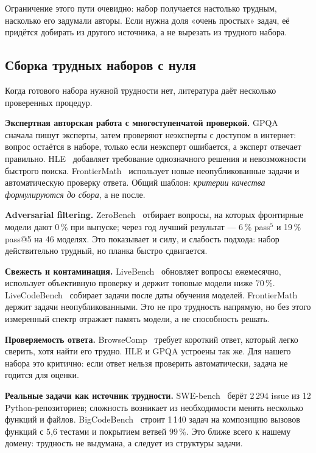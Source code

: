 \documentclass[11pt,a4paper]{article}
\begin{document}
Ограничение этого пути очевидно: набор получается настолько трудным,
насколько его задумали авторы. Если нужна доля «очень простых» задач, её
придётся добирать из другого источника, а не вырезать из трудного набора.

\subsection{Сборка трудных наборов с нуля}

Когда готового набора нужной трудности нет, литература даёт несколько
проверенных процедур.

\textbf{Экспертная авторская работа с многоступенчатой проверкой.}
GPQA~\cite{gpqa2023} сначала пишут эксперты, затем проверяют неэксперты с
доступом в интернет: вопрос остаётся в наборе, только если неэксперт
ошибается, а эксперт отвечает правильно. HLE~\cite{hle2025} добавляет
требование однозначного решения и невозможности быстрого поиска.
FrontierMath~\cite{frontiermath2024} использует новые неопубликованные
задачи и автоматическую проверку ответа. Общий шаблон: \emph{критерии
качества формулируются до сбора}, а не после.

\textbf{Adversarial filtering.} ZeroBench~\cite{zerobench2025} отбирает
вопросы, на которых фронтирные модели дают 0\,\% при выпуске; через год
лучший результат — 6\,\% pass$^5$ и 19\,\% pass@5 на 46 моделях. Это
показывает и силу, и слабость подхода: набор действительно трудный, но
планка быстро сдвигается.

\textbf{Свежесть и контаминация.} LiveBench~\cite{livebench2024} обновляет
вопросы ежемесячно, использует объективную проверку и держит топовые модели
ниже 70\,\%. LiveCodeBench~\cite{livecodebench2024} собирает задачи после
даты обучения моделей. FrontierMath~\cite{frontiermath2024} держит задачи
неопубликованными. Это не про трудность напрямую, но без этого измеренный
спектр отражает память модели, а не способность решать.

\textbf{Проверяемость ответа.} BrowseComp~\cite{browsecomp2025} требует
короткий ответ, который легко сверить, хотя найти его трудно. HLE и GPQA
устроены так же. Для нашего набора это критично: если ответ нельзя
проверить автоматически, задача не годится для оценки.

\textbf{Реальные задачи как источник трудности.} SWE-bench~\cite{swebench2023}
берёт 2\,294 issue из 12 Python-репозиториев; сложность возникает из
необходимости менять несколько функций и файлов. BigCodeBench~\cite{bigcodebench2024}
строит 1\,140 задач на композицию вызовов функций с 5,6 тестами и покрытием
ветвей 99\,\%. Это ближе всего к нашему домену: трудность не выдумана, а
следует из структуры задачи.
\end{document}
